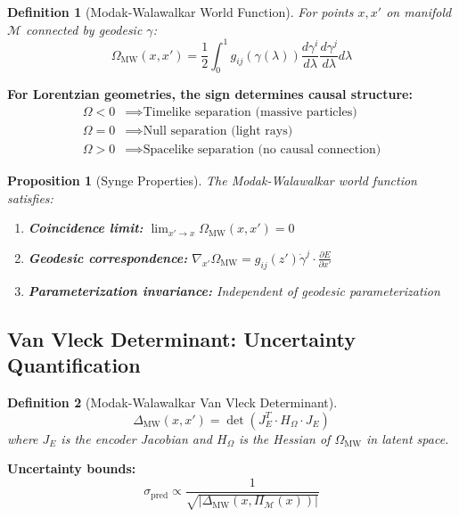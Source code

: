 \documentclass[11pt,a4paper]{article}
\newtheorem{theorem}{Proposition}
\newtheorem{definition}{Definition}
\begin{document}
\begin{definition}[Modak-Walawalkar World Function]
For points $x, x'$ on manifold $\mathcal{M}$ connected by geodesic $\gamma$:
\begin{equation}
\Omega_{\text{MW}}(x,x') = \frac{1}{2}\int_0^1 g_{ij}(\gamma(\lambda)) \frac{d\gamma^i}{d\lambda}\frac{d\gamma^j}{d\lambda} d\lambda
\end{equation}
\end{definition}

\textbf{For Lorentzian geometries, the sign determines causal structure:}
\begin{align}
\Omega < 0 &\implies \text{Timelike separation (massive particles)} \\
\Omega = 0 &\implies \text{Null separation (light rays)} \\
\Omega > 0 &\implies \text{Spacelike separation (no causal connection)}
\end{align}

\begin{theorem}[Synge Properties]
The Modak-Walawalkar world function satisfies:
\begin{enumerate}
\item \textbf{Coincidence limit:} $\lim_{x' \to x} \Omega_{\text{MW}}(x,x') = 0$
\item \textbf{Geodesic correspondence:} $\nabla_{x'}\Omega_{\text{MW}} = g_{ij}(z')\dot{\gamma}^j \cdot \frac{\partial E}{\partial x'}$
\item \textbf{Parameterization invariance:} Independent of geodesic parameterization
\end{enumerate}
\end{theorem}

\subsection{Van Vleck Determinant: Uncertainty Quantification}

\begin{definition}[Modak-Walawalkar Van Vleck Determinant]
\begin{equation}
\Delta_{\text{MW}}(x,x') = \det\left(J_E^T \cdot H_\Omega \cdot J_E\right)
\end{equation}
where $J_E$ is the encoder Jacobian and $H_\Omega$ is the Hessian of $\Omega_{\text{MW}}$ in latent space.
\end{definition}

\textbf{Uncertainty bounds:}
\begin{equation}
\sigma_{\text{pred}} \propto \frac{1}{\sqrt{|\Delta_{\text{MW}}(x,\Pi_{\mathcal{M}}(x))|}}
\end{equation}
\end{document}
